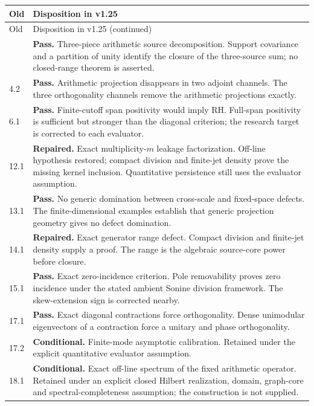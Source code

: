 \documentclass[11pt]{article}
\theoremstyle{remark}
\begin{document}
\small
\begin{longtable}{@{}p{}p{}@{}}
\toprule Old & Disposition in v1.25 \\
\midrule\endfirsthead
\toprule Old & Disposition in v1.25 (continued) \\
\midrule\endhead
\bottomrule\endfoot
4.1 & \textbf{Pass.} Three-piece arithmetic source decomposition. Support covariance and a partition of unity identify the closure of the three-source sum; no closed-range theorem is asserted. \\[4pt]
4.2 & \textbf{Pass.} Arithmetic projection disappears in two adjoint channels. The three orthogonality channels remove the arithmetic projections exactly. \\[4pt]
6.1 & \textbf{Pass.} Finite-cutoff span positivity would imply RH. Full-span positivity is sufficient but stronger than the diagonal criterion; the research target is corrected to each evaluator. \\[4pt]
12.1 & \textbf{Repaired.} Exact multiplicity-$m$ leakage factorization. Off-line hypothesis restored; compact division and finite-jet density prove the missing kernel inclusion. Quantitative persistence still uses the evaluator assumption. \\[4pt]
13.1 & \textbf{Pass.} No generic domination between cross-scale and fixed-space defects. The finite-dimensional examples establish that generic projection geometry gives no defect domination. \\[4pt]
14.1 & \textbf{Repaired.} Exact generator range defect. Compact division and finite-jet density supply a proof. The range is the algebraic source-core power before closure. \\[4pt]
15.1 & \textbf{Pass.} Exact zero-incidence criterion. Pole removability proves zero incidence under the stated ambient Sonine division framework. The skew-extension sign is corrected nearby. \\[4pt]
17.1 & \textbf{Pass.} Exact diagonal contractions force orthogonality. Dense unimodular eigenvectors of a contraction force a unitary and phase orthogonality. \\[4pt]
17.2 & \textbf{Conditional.} Finite-mode asymptotic calibration. Retained under the explicit quantitative evaluator assumption. \\[4pt]
18.1 & \textbf{Conditional.} Exact off-line spectrum of the fixed arithmetic operator. Retained under an explicit closed Hilbert realization, domain, graph-core and spectral-completeness assumption; the construction is not supplied. \\[4pt]

\end{longtable}
\end{document}
